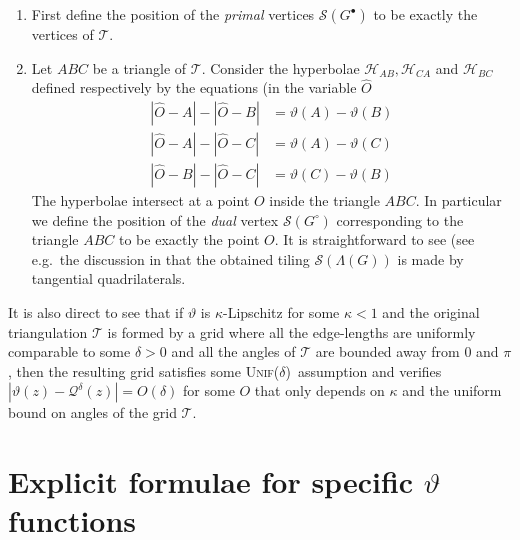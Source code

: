 \documentclass[reqno]{amsart}
\numberwithin{equation}{section}
\theoremstyle{definition}
\theoremstyle{remark}
\newcommand\cQ{\mathcal{Q}}
\newcommand\cS{\mathcal{S}}
\newcommand\Unif{{\mbox{\textsc{Unif(}$\delta$\textsc{)}}}}
\begin{document}
\begin{enumerate}
	\item First define the position of the \emph{primal} vertices $\cS(G^\bullet)$ to be exactly the vertices of $\mathcal{T}$.
	\item Let $ABC$ be a triangle of $\mathcal{T}$. Consider the hyperbolae  $\mathcal{H}_{AB},\mathcal{H}_{CA}$ and $\mathcal{H}_{BC}$ defined respectively by the equations (in the variable $\widehat{O} $
\begin{align*}
	|\widehat{O}- A| - |\widehat{O}- B| &= \vartheta(A) - \vartheta(B)\\
	|\widehat{O}- A| - |\widehat{O}- C| &= \vartheta(A) - \vartheta(C) \\
	|\widehat{O}- B| - |\widehat{O}- C| &= \vartheta(C) - \vartheta(B)
\end{align*}
The hyperbolae intersect at a point $O$ inside the triangle $ABC$. In particular we define the position of the \emph{dual} vertex  $\cS(G^\circ)$ corresponding to the triangle $ABC$ to be exactly the point $O$. It is straightforward to see (see e.g.\ the discussion in \cite[Section 3.1]{Mah23} that the obtained tiling $\cS(\Lambda(G))$ is made by tangential quadrilaterals. 
\end{enumerate}
It is also direct to see that if $\vartheta $ is $\kappa$-Lipschitz for some $\kappa<1$ and the original triangulation $\mathcal{T}$ is formed by a grid where all the edge-lengths are uniformly comparable to some $\delta >0 $ and all the angles of $\mathcal{T}$ are bounded away from $0$ and $\pi $, then the resulting grid satisfies some \Unif\, assumption and verifies $ |\vartheta(z)-\cQ^{\delta}(z) |= O(\delta) $ for some $O$ that only depends on $\kappa $ and the uniform bound on angles of the grid $\mathcal{T}$.


\section{Explicit formulae for specific $\vartheta$ functions}
\end{document}
